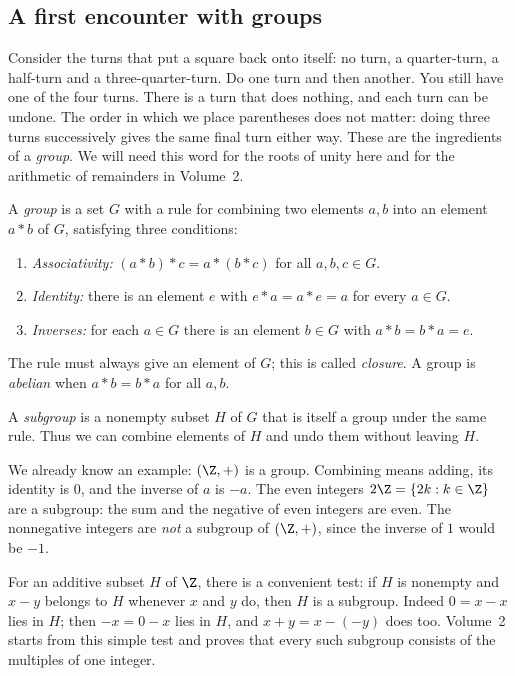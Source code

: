 \subsection*{A first encounter with groups}

Consider the turns that put a square back onto itself: no turn, a quarter-turn, a half-turn and a three-quarter-turn. Do one turn and then another. You still have one of the four turns. There is a turn that does nothing, and each turn can be undone. The order in which we place parentheses does not matter: doing three turns successively gives the same final turn either way. These are the ingredients of a \emph{group}. We will need this word for the roots of unity here and for the arithmetic of remainders in Volume~2.

\begin{definition}\label{def:elementary-group}
A \emph{group} is a set $G$ with a rule for combining two elements $a,b$ into an element $a*b$ of $G$, satisfying three conditions:
\begin{enumerate}[label=(\roman*)]
\item \emph{Associativity:} $(a*b)*c=a*(b*c)$ for all $a,b,c\in G$.
\item \emph{Identity:} there is an element $e$ with $e*a=a*e=a$ for every $a\in G$.
\item \emph{Inverses:} for each $a\in G$ there is an element $b\in G$ with $a*b=b*a=e$.
\end{enumerate}
The rule must always give an element of $G$; this is called \emph{closure}. A group is \emph{abelian} when $a*b=b*a$ for all $a,b$.

A \emph{subgroup} is a nonempty subset $H$ of $G$ that is itself a group under the same rule. Thus we can combine elements of $H$ and undo them without leaving $H$.
\end{definition}

We already know an example: $(\Z,+)$ is a group. Combining means adding, its identity is $0$, and the inverse of $a$ is $-a$. The even integers $2\Z=\{2k:k\in\Z\}$ are a subgroup: the sum and the negative of even integers are even. The nonnegative integers are \emph{not} a subgroup of $(\Z,+)$, since the inverse of $1$ would be $-1$.

For an additive subset $H$ of $\Z$, there is a convenient test: if $H$ is nonempty and $x-y$ belongs to $H$ whenever $x$ and $y$ do, then $H$ is a subgroup. Indeed $0=x-x$ lies in $H$; then $-x=0-x$ lies in $H$, and $x+y=x-(-y)$ does too. Volume~2 starts from this simple test and proves that every such subgroup consists of the multiples of one integer.

